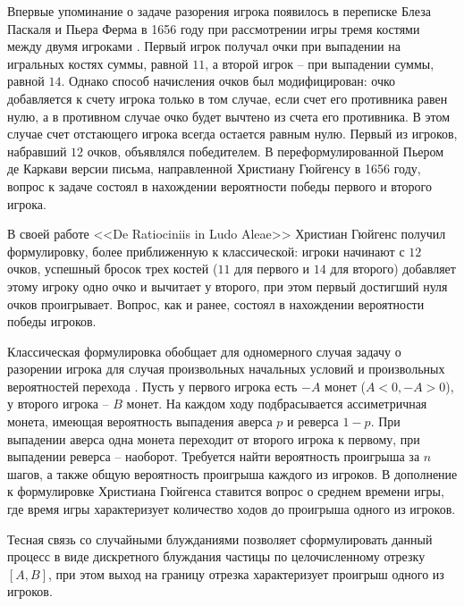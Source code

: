 Впервые упоминание о задаче разорения игрока появилось в переписке Блеза Паскаля и Пьера Ферма в 1656 году при рассмотрении игры тремя костями между двумя игроками \cite{renyi_1980}. Первый игрок получал очки при выпадении на игральных костях суммы, равной $11$, а второй игрок -- при выпадении суммы, равной $14$. Однако способ начисления очков был модифицирован: очко добавляется к счету игрока только в том случае, если счет его противника равен нулю, а в противном случае очко будет вычтено из счета его противника. В этом случае счет отстающего игрока всегда остается равным нулю. Первый из игроков, набравший $12$ очков, объявлялся победителем. В переформулированной Пьером де Каркави версии письма, направленной Христиану Гюйгенсу в 1656 году, вопрос к задаче состоял в нахождении вероятности победы первого и второго игрока. 

В своей работе <<De Ratiociniis in Ludo Aleae>> Христиан Гюйгенс \cite{hald_history_2003,huygens_christiani_1714} получил формулировку, более приближенную к классической: игроки начинают с $12$ очков, успешный бросок  трех костей ($11$ для первого и $14$ для второго) добавляет этому игроку одно очко и вычитает у второго, при этом первый достигший нуля очков проигрывает. Вопрос, как и ранее, состоял в нахождении вероятности победы игроков. 

Классическая формулировка обобщает для одномерного случая задачу о разорении игрока для случая произвольных начальных условий и произвольных вероятностей перехода \cite{feller_introduction_1968}. Пусть у первого игрока есть $-A$ монет ($A < 0, -A > 0$), у второго игрока -- $B$ монет. На каждом ходу подбрасывается ассиметричная монета, имеющая вероятность выпадения аверса $p$ и реверса $1-p$. При выпадении аверса одна монета переходит от второго игрока к первому, при выпадении реверса -- наоборот. Требуется найти вероятность проигрыша за $n$ шагов, а также общую вероятность проигрыша каждого из игроков. В дополнение к формулировке Христиана Гюйгенса ставится вопрос о среднем времени игры, где время игры характеризует количество ходов до проигрыша одного из игроков.

Тесная связь со случайными блужданиями позволяет сформулировать данный процесс в виде дискретного блуждания частицы по целочисленному отрезку $[A, B]$, при этом выход на границу отрезка характеризует проигрыш одного из игроков. \cite{shiryaev_2021} 

